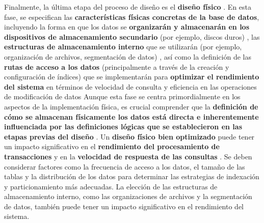 Finalmente, la última etapa del proceso de diseño es el \textbf{diseño físico} \cite{Fundamentos-de-Sistemas-de-Bases-de-Datos.pdf:61, FBD_1.pdf:24, 25, 26, 27}. En esta fase, se especifican las \textbf{características físicas concretas de la base de datos}, incluyendo la forma en que los datos se \textbf{organizarán y almacenarán en los dispositivos de almacenamiento secundario} (por ejemplo, discos duros) \cite{Fundamentos-de-Sistemas-de-Bases-de-Datos.pdf:396, 419, FBD_1.pdf:24, 25}, las \textbf{estructuras de almacenamiento interno} que se utilizarán (por ejemplo, organización de archivos, segmentación de datos) \cite{Fundamentos-de-Sistemas-de-Bases-de-Datos.pdf:396, 419}, así como la definición de las \textbf{rutas de acceso a los datos} (principalmente a través de la creación y configuración de índices) que se implementarán para \textbf{optimizar el rendimiento del sistema} en términos de velocidad de consulta y eficiencia en las operaciones de modificación de datos \cite{Fundamentos-de-Sistemas-de-Bases-de-Datos.pdf:433, FBD_1.pdf:24, 25, 26, 27} Aunque esta fase se centra primordialmente en los aspectos de la implementación física, es crucial comprender que la \textbf{definición de cómo se almacenan físicamente los datos está directa e inherentemente influenciada por las definiciones lógicas que se establecieron en las etapas previas del diseño} \cite{Fundamentos-de-Sistemas-de-Bases-de-Datos.pdf:396, 419}. Un \textbf{diseño físico bien optimizado} puede tener un impacto significativo en el \textbf{rendimiento del procesamiento de transacciones} y en la \textbf{velocidad de respuesta de las consultas} \cite{Fundamentos-de-Sistemas-de-Bases-de-Datos.pdf:101, 396, 419}. Se deben considerar factores como la frecuencia de acceso a los datos, el tamaño de las tablas y la distribución de los datos para determinar las estrategias de indexación y particionamiento más adecuadas. La elección de las estructuras de almacenamiento interno, como las organizaciones de archivos y la segmentación de datos, también puede tener un impacto significativo en el rendimiento del sistema.

